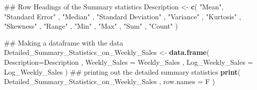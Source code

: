 \documentclass[]{article}
\newenvironment{Shaded}{\begin{snugshade}}{\end{snugshade}}
\newcommand{\KeywordTok}[1]{\textcolor[rgb]{0.13,0.29,0.53}{\textbf{{#1}}}}
\newcommand{\DataTypeTok}[1]{\textcolor[rgb]{0.13,0.29,0.53}{{#1}}}
\newcommand{\DecValTok}[1]{\textcolor[rgb]{0.00,0.00,0.81}{{#1}}}
\newcommand{\StringTok}[1]{\textcolor[rgb]{0.31,0.60,0.02}{{#1}}}
\newcommand{\NormalTok}[1]{{#1}}
\begin{document}
\begin{Shaded}
\end{Shaded}

\begin{Shaded}
\begin{Highlighting}[]
\NormalTok{## Row Headings of the Summary statistics}
\NormalTok{Description <-}\StringTok{ }\KeywordTok{c}\NormalTok{(}
  \StringTok{"Mean"}\NormalTok{,}
  \StringTok{"Standard Error"} \NormalTok{,}
  \StringTok{"Median"} \NormalTok{, }
  \StringTok{"Standard Deviation"} \NormalTok{,}
  \StringTok{"Variance"} \NormalTok{, }
  \StringTok{"Kurtosis"} \NormalTok{,}
  \StringTok{"Skewness"} \NormalTok{,}
  \StringTok{"Range"} \NormalTok{,}
  \StringTok{"Min"} \NormalTok{,}
  \StringTok{"Max"} \NormalTok{,}
  \StringTok{"Sum"} \NormalTok{,}
  \StringTok{"Count"} 
\NormalTok{)}
\end{Highlighting}
\end{Shaded}

\begin{Shaded}
\begin{Highlighting}[]
\NormalTok{## Making a dataframe with the data}
\NormalTok{Detailed_Summary_Statistics_on_Weekly_Sales <-}\StringTok{ }
\StringTok{  }\KeywordTok{data.frame}\NormalTok{( }
    \DataTypeTok{Description=}\NormalTok{Description , }
    \DataTypeTok{Weekly_Sales =} \NormalTok{Weekly_Sales ,}
    \DataTypeTok{Log_Weekly_Sales =} \NormalTok{Log_Weekly_Sales}
    \NormalTok{)}
\NormalTok{## printing out the detailed summary statistics }
\KeywordTok{print}\NormalTok{( Detailed_Summary_Statistics_on_Weekly_Sales , }\DataTypeTok{row.names =} \NormalTok{F )}
\end{Highlighting}
\end{Shaded}
\end{document}
